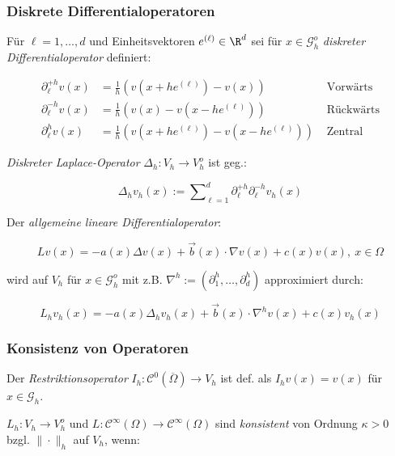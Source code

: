 \subsubsection*{Diskrete Differentialoperatoren}

Für $\ell = 1,\dots,d$ und Einheitsvektoren $e^{(\ell)} \in \R^d$ sei für $x \in \mathcal{G}_h^o$ \emph{diskreter Differentialoperator} definiert:

\vspace*{-4mm}
\begin{align*}
\partial_\ell^{+h} v(x) &= \frac{1}{h} \left( v(x+he^{(\ell)}) - v(x) \right) &\text{ Vorwärts} \\
\partial_\ell^{-h} v(x) &= \frac{1}{h} \left( v(x) - v(x-he^{(\ell)}) \right) &\text{ Rückwärts} \\
\partial_\ell^{h} v(x) &= \frac{1}{h} \left( v(x+he^{(\ell)}) - v(x - he^{(\ell)}) \right) &\text{ Zentral}
\end{align*}

\emph{Diskreter Laplace-Operator} $\Delta_h : V_h \to V_h^o$ ist geg.:

\vspace*{-2mm}
\[ \Delta_h v_h(x) := \displaystyle\sum\nolimits_{\ell = 1}^d \partial_\ell^{+h} \partial_\ell^{-h} v_h(x) \]

Der \emph{allgemeine lineare Differentialoperator}:

\vspace*{-4mm}
\[ Lv(x) = -a(x)\Delta v(x) + \vec{b}(x) \cdot \nabla v(x) + c(x)v(x), \ x \in \Omega \]

wird auf $V_h$ für $x \in \mathcal{G}_h^o$ mit z.B. $\nabla^h := \left(\partial_1^h,\dots,\partial_d^h\right)$ approximiert durch:

\vspace*{-4mm}
\[ L_h v_h(x) = -a(x)\Delta_h v_h(x) + \vec{b}(x) \cdot \nabla^h v(x) + c(x)v_h(x) \]

\subsubsection*{Konsistenz von Operatoren}

Der \emph{Restriktionsoperator} $I_h : \mathcal{C}^0(\overline\Omega) \to V_h$ ist def. als $I_h v(x) = v(x)$ für $x \in \mathcal{G}_h$. 

\spacing

$L_h : V_h \to V_h^o$ und $L : \mathcal{C}^\infty(\Omega) \to \mathcal{C}^\infty(\Omega)$ sind \emph{konsistent} von Ordnung $\kappa > 0$ bzgl. $\|\cdot\|_h$ auf $V_h$, wenn:

